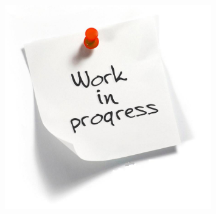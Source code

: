 \documentclass[11pt]{beamer}
\begin{document}
%	
%

\begin{frame}
	\begin{center}
		\begin{figure}
			\includegraphics[width=0.8\textwidth]{img/logo_work_in_progress2.jpg}
		\end{figure}	
	\end{center}
\end{frame}

\end{document}
